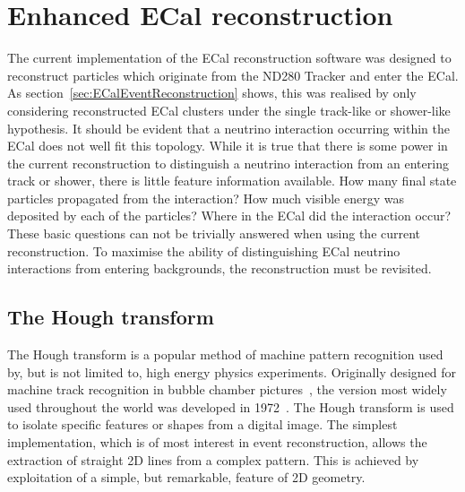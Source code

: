 \chapter{Enhanced ECal reconstruction}
\label{chap:EnhancedECalReconstruction}
The current implementation of the ECal reconstruction software was designed to reconstruct particles which originate from the ND280 Tracker and enter the ECal.  As section~\ref{sec:ECalEventReconstruction} shows, this was realised by only considering reconstructed ECal clusters under the single track-like or shower-like hypothesis.  It should be evident that a neutrino interaction occurring within the ECal does not well fit this topology.  While it is true that there is some power in the current reconstruction to distinguish a neutrino interaction from an entering track or shower, there is little feature information available.  How many final state particles propagated from the interaction?  How much visible energy was deposited by each of the particles?  Where in the ECal did the interaction occur?  These basic questions can not be trivially answered when using the current reconstruction.  To maximise the ability of distinguishing ECal neutrino interactions from entering backgrounds, the reconstruction must be revisited.

\section{The Hough transform}
\label{sec:HoughTransform}
The Hough transform is a popular method of machine pattern recognition used by, but is not limited to, high energy physics experiments.  Originally designed for machine track recognition in bubble chamber pictures~\cite{Hough:1959qva}, the version most widely used throughout the world was developed in 1972~\cite{Duda:1972:UHT:361237.361242}.  The Hough transform is used to isolate specific features or shapes from a digital image.  The simplest implementation, which is of most interest in event reconstruction, allows the extraction of straight 2D lines from a complex pattern.  This is achieved by exploitation of a simple, but remarkable, feature of 2D geometry.

